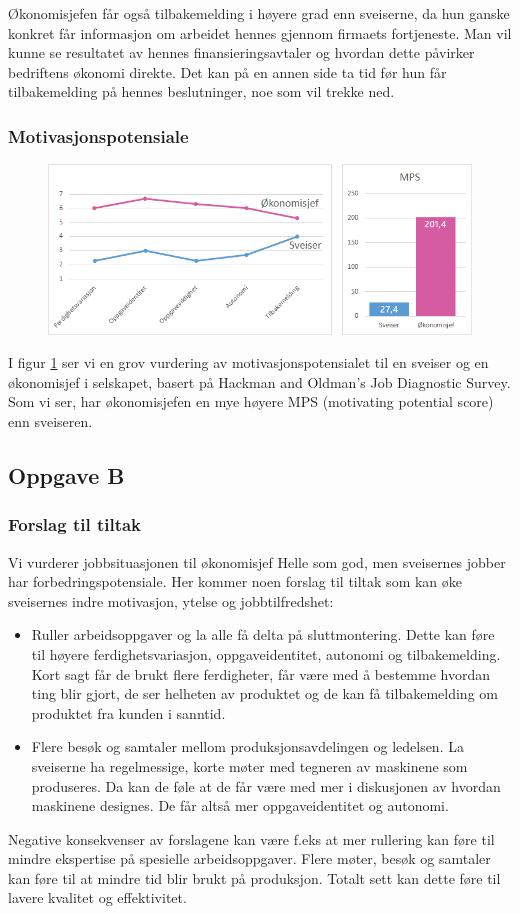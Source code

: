Økonomisjefen får også tilbakemelding i høyere grad enn sveiserne, da hun ganske konkret får informasjon om arbeidet hennes gjennom firmaets fortjeneste. Man vil kunne se resultatet av hennes finansieringsavtaler og hvordan dette påvirker bedriftens økonomi direkte. Det kan på en annen side ta tid før hun får tilbakemelding på hennes beslutninger, noe som vil trekke ned.

\subsubsection{Motivasjonspotensiale}
\begin{figure}[ht!]
    \centering
    \includegraphics[width=135mm]{mps.png}
    \label{fig:mps}
\end{figure}
I figur \ref{fig:mps} ser vi en grov vurdering av motivasjonspotensialet til en sveiser og en økonomisjef i selskapet, basert på Hackman and Oldman’s Job Diagnostic Survey. Som vi ser, har økonomisjefen en mye høyere MPS (motivating potential score) enn sveiseren.


\subsection{Oppgave B}
\subsubsection{Forslag til tiltak}
Vi vurderer jobbsituasjonen til økonomisjef Helle som god, men sveisernes jobber har forbedringspotensiale. Her kommer noen forslag til tiltak som kan øke sveisernes indre motivasjon, ytelse og jobbtilfredshet:

\begin{itemize}
  \item Ruller arbeidsoppgaver og la alle få delta på sluttmontering. Dette kan føre til høyere ferdighetsvariasjon, oppgaveidentitet, autonomi og tilbakemelding. Kort sagt får de brukt flere ferdigheter, får være med å bestemme hvordan ting blir gjort, de ser helheten av produktet og de kan få tilbakemelding om produktet fra kunden i sanntid.
  \item Flere besøk og samtaler mellom produksjonsavdelingen og ledelsen. La sveiserne ha regelmessige, korte møter med tegneren av maskinene som produseres. Da kan de føle at de får være med mer i diskusjonen av hvordan maskinene designes. De får altså mer oppgaveidentitet og autonomi.
\end{itemize}

Negative konsekvenser av forslagene kan være f.eks at mer rullering kan føre til mindre ekspertise på spesielle arbeidsoppgaver. Flere møter, besøk og samtaler kan føre til at mindre tid blir brukt på produksjon. Totalt sett kan dette føre til lavere kvalitet og effektivitet.
